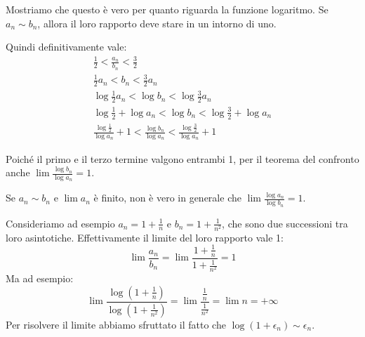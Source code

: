 Mostriamo che questo è vero per quanto riguarda la funzione logaritmo. Se $a_n \sim b_n$, allora il loro rapporto deve stare in un intorno di uno.

Quindi definitivamente vale:
\begin{gather*}
\frac{1}{2} < \frac{a_n}{b_n} < \frac{3}{2} \\
\frac{1}{2}a_n < b_n < \frac{3}{2}a_n \\
\log \frac{1}{2}a_n < \log b_n < \log \frac{3}{2}a_n \\
\log \frac{1}{2} + \log a_n < \log b_n < \log \frac{3}{2} + \log a_n \\
\frac{\log \frac{1}{2}}{\log a_n} + 1 < \frac{\log b_n}{\log a_n} < \frac{\log \frac{3}{2}}{\log a_n} + 1
\end{gather*}

Poiché il primo e il terzo termine valgono entrambi 1, per il teorema del confronto anche $\lim \frac{\log b_n}{\log a_n} = 1$.

\begin{remark}
Se $a_n \sim b_n$ e $\lim a_n$ è finito, non è vero in generale che $\lim \frac{\log a_n}{\log b_n} = 1$.
\end{remark}

\begin{example}
Consideriamo ad esempio $a_n = 1 + \frac{1}{n}$ e $b_n = 1 + \frac{1}{n^2}$, che sono due successioni tra loro asintotiche. Effettivamente il limite del loro rapporto vale 1:
\begin{equation*}
\lim \frac{a_n}{b_n} = \lim \frac{1 + \frac{1}{n}}{1 + \frac{1}{n^2}} = 1
\end{equation*}
Ma ad esempio:
\begin{equation*}
\lim \frac{\log (1 + \frac{1}{n})}{\log (1 + \frac{1}{n^2})} = \lim \frac{\frac{1}{n}}{\frac{1}{n^2}} = \lim n = +\infty
\end{equation*}
Per risolvere il limite abbiamo sfruttato il fatto che $\log(1+\epsilon_n) \sim \epsilon_n$.
\end{example}

